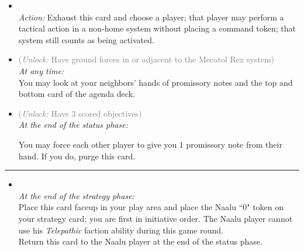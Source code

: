 \begin{multicols}{2}
\begin{itemize}
\item {}\\
\emph{Action:}
Exhaust this card and choose a player; that player may perform a tactical action in a non-home system without placing a command token; that system still counts as being activated.
\item {} \textcolor{gray}{(\emph{Unlock:} Have ground forces in or adjacent to the Mecatol Rex system)}\\
\emph{At any time:}\\
You may look at your neighbors' hands of promissory notes and the top and bottom card of the agenda deck.
\item {} \textcolor{gray}{(\emph{Unlock:} Have 3 scored objectives)}\\
\emph{At the end of the status phase:}

You may force each other player to give you 1 promissory note from their hand. If you do, purge this card.
\end{itemize}

\vspace{-10pt}\rule{\hsize}{0.4pt}\vspace{5pt}


\begin{itemize}
\item {}\\
\emph{At the end of the strategy phase:}\\
Place this card faceup in your play area and place the Naalu ``0" token on your strategy card; you are first in initiative order. The Naalu player cannot use his \emph{Telepathic} faction ability during this game round.\\
Return this card to the Naalu player at the end of the status phase.
\end{itemize}

\end{multicols}



